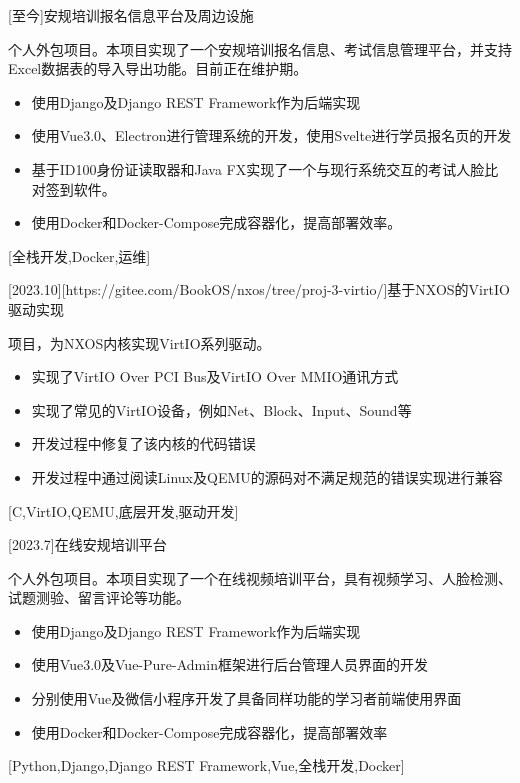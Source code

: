 \documentclass[zh]{resume}
\begin{document}
\begin {projects}
	[至今]{安规培训报名信息平台及周边设施}{
		个人外包项目。本项目实现了一个安规培训报名信息、考试信息管理平台，并支持Excel数据表的导入导出功能。目前正在维护期。
		\begin{itemize}
			\item 使用Django及Django REST Framework作为后端实现
			\item 使用Vue3.0、Electron进行管理系统的开发，使用Svelte进行学员报名页的开发
			\item 基于ID100身份证读取器和Java FX实现了一个与现行系统交互的考试人脸比对签到软件。
			\item 使用Docker和Docker-Compose完成容器化，提高部署效率。
		\end{itemize}
	}[全栈开发,Docker,运维]

	[2023.10][https://gitee.com/BookOS/nxos/tree/proj-3-virtio/]{基于NXOS的VirtIO驱动实现}{
		项目，为NXOS内核实现VirtIO系列驱动。
		\begin{itemize}
			\item 实现了VirtIO Over PCI Bus及VirtIO Over MMIO通讯方式
			\item 实现了常见的VirtIO设备，例如Net、Block、Input、Sound等
			\item 开发过程中修复了该内核的代码错误
			\item 开发过程中通过阅读Linux及QEMU的源码对不满足规范的错误实现进行兼容
		\end{itemize}
	}[C,VirtIO,QEMU,底层开发,驱动开发]

	[2023.7]{在线安规培训平台}{
		个人外包项目。本项目实现了一个在线视频培训平台，具有视频学习、人脸检测、试题测验、留言评论等功能。
		\begin{itemize}
			\item 使用Django及Django REST Framework作为后端实现
			\item 使用Vue3.0及Vue-Pure-Admin框架进行后台管理人员界面的开发
			\item 分别使用Vue及微信小程序开发了具备同样功能的学习者前端使用界面
			\item 使用Docker和Docker-Compose完成容器化，提高部署效率
		\end{itemize}
	}[Python,Django,Django REST Framework,Vue,全栈开发,Docker]


\end{projects}
\end{document}
